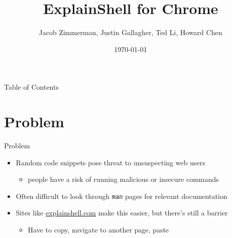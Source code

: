 \documentclass[xcolor=dvipsnames]{beamer}
\title{ExplainShell for Chrome}
\author{Jacob Zimmerman, Justin Gallagher, Ted Li, Howard Chen}
\institute{Carnegie Mellon University}
\date{\today}
\begin{document}

\begin{frame}
\titlepage
\end{frame}

\begin{frame}{Table of Contents}
  \tableofcontents
\end{frame}

\section{Problem}\label{problem}
\begin{frame}{Problem}

\begin{itemize}
\itemsep1pt\parskip0pt
\item
  Random code snippets pose threat to unsuspecting web users

  \begin{itemize}
  \itemsep1pt\parskip0pt
  \item
    people have a risk of running malicious or insecure commands
  \end{itemize}
\item
  Often difficult to look through \texttt{man} pages for relevant
  documentation
\item
  Sites like \href{http://explainshell.com/}{explainshell.com} make this
  easier, but there's still a barrier

  \begin{itemize}
  \itemsep1pt\parskip0pt
  \item
    Have to copy, navigate to another page, paste
  \end{itemize}
\end{itemize}

\end{frame}
\end{document}
